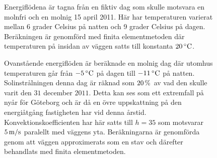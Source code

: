 \begin{figure}[hpbt]
\caption{Energiflödena är tagna från en fiktiv dag som skulle motsvara en molnfri
och en molnig
15 april 2011. Här har temperaturen varierat mellan 6 grader Celsius på natten och
9 grader Celsius på dagen. Beräkningen är genomförd med finita elementmetoden där
temperaturen på insidan av väggen satts till konstanta $\unit[20]{^\circ C}$.}
\end{figure}


\begin{figure}[hpbt]
\centering
{}
\vspace{5mm}
\caption{Ovanstående energiflöden är beräknade en molnig dag där
utomhus temperaturen går från $\unit[-5]{^\circ C}$ på dagen
till $\unit[-11]{^\circ C}$ på natten. Solinstrålningen denna dag är
räknad som $\unit[20]{\%}$ av vad den skulle varit den $31$ december $2011$.
Detta kan ses som ett extremfall på nyår för Göteborg och är då en övre
uppskattning på den energiåtgång fastigheten har vid denna årstid.
Konvektionskoefficienten har här satts till $h=35$ som motsvarar
$\unit[5]{m/s}$ paralellt med väggens yta. Beräkningarna är genomförda
genom att väggen approximerats som en stav och därefter behandlats med
finita elementmetoden.}
\end{figure}

